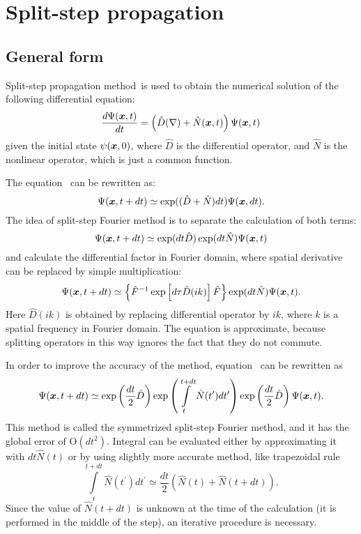 \chapter{Split-step propagation}
\label{cha:appendix:split-step}


\section{General form}

Split-step propagation method~\citationneeded is used to obtain the numerical solution of the following differential equation:
\begin{equation}
\label{eqn:split-step:general-eqn}
	\frac{d\Psi(\boldsymbol{x}, t)}{dt} = \left(
		\hat{D}(\nabla) + \hat{N}(\boldsymbol{x}, t)
	\right) \Psi(\boldsymbol{x}, t)
\end{equation}
given the initial state $\psi(\boldsymbol{x}, 0)$,
where $\hat{D}$ is the differential operator, and $\hat{N}$ is the nonlinear operator,
which is just a common function.

The equation~ can be rewritten as:
\[
	\Psi(\boldsymbol{x}, t + dt) \simeq \exp ( ( \hat{D} + \hat{N} ) dt ) \Psi(\boldsymbol{x}, dt).
\]
The idea of split-step Fourier method is to separate the calculation of both terms:
\begin{equation}
\label{eqn:split-step:split-eqn}
	\Psi(\boldsymbol{x}, t + dt) \simeq \exp(dt \hat{D}) \exp(dt \hat{N}) \Psi(\boldsymbol{x}, t)
\end{equation}
and calculate the differential factor in Fourier domain, where spatial derivative can be replaced by simple multiplication:
\[
	\Psi(\boldsymbol{x}, t + dt) \simeq \left\{
		\hat{F}^{-1} \exp \left[
			d\tau \hat{D}(i k)
		\right] \hat{F}
	\right\}
	\exp(dt \hat{N}) \Psi(\boldsymbol{x}, t).
\]
Here $\hat{D}(i k)$ is obtained by replacing differential operator by $i k$,
where $k$ is a spatial frequency in Fourier domain.
The equation is approximate, because splitting operators in this way ignores the fact that they do not commute.

In order to improve the accuracy of the method, equation~ can be rewritten as~\cite{Sinkin2003}
\[
	\Psi(\boldsymbol{x}, t + dt) \simeq
	\exp \left( \frac{dt}{2} \hat{D} \right)
	\exp \left( \int\limits^{t + dt}_t \hat{N} (t^\prime) dt^\prime \right)
	\exp \left( \frac{dt}{2} \hat{D} \right) \Psi(\boldsymbol{x}, t).
\]
This method is called the symmetrized split-step Fourier method, and it has the global error of $\mbox{O}(dt^2)$.
Integral can be evaluated either by approximating it with $dt \hat{N}(t)$ or by using slightly more accurate method,
like trapezoidal rule
\[
	\int\limits^{t + dt}_t \hat{N} (t^\prime) dt^\prime \simeq
	\frac{dt}{2} \left( \hat{N}(t) + \hat{N}(t + dt) \right).
\]
Since the value of $\hat{N}(t + dt)$ is unknown at the time of the calculation
(it is performed in the middle of the step), an iterative procedure is necessary.


